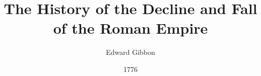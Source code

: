 \documentclass[12pt]{book}
\begin{document}
\title{The History of the Decline and Fall of the Roman Empire}
\author{Edward Gibbon}
\date{1776}

\frontmatter
\maketitle
\tableofcontents



\begin{multicols*}{2}
\theendnotes
\end{multicols*}
\end{document}
